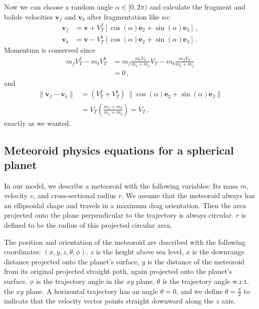 Now we can choose a random angle $\alpha \in [0, 2\pi)$ and calculate the fragment and bolide velocities $\pmb{v}_f$ and $\pmb{v}_b$ after fragmentation like so:
\begin{align}
    \pmb{v}_f &= \pmb{v} + V_T^f[\cos(\alpha)\pmb{e}_2 + \sin(\alpha)\pmb{e}_3]\,,\\
    \pmb{v}_b &= \pmb{v} - V_T^b[\cos(\alpha)\pmb{e}_2 + \sin(\alpha)\pmb{e}_3]\,.
\end{align}
Momentum is conserved since
\begin{align*}
    m_f V_T^f - m_b V_T^b &= m_f\frac{m_b V_T}{m_b + m_f}V_T - m_b\frac{m_f V_T}{m_b + m_f} \\
    &= 0\,,
\end{align*}
and 
\begin{align*}
    \|\pmb{v}_f - \pmb{v}_b\| &= (V_T^f + V_T^b)\ \|\cos(\alpha)\pmb{e}_2 + \sin(\alpha)\pmb{e}_3\| \\
    &= V_T \left(\frac{m_f + m_b}{m_f + m_b}\right) = V_T\,,
\end{align*}
exactly as we wanted.

\subsection{Meteoroid physics equations for a spherical planet}

In our model, we describe a meteoroid with the following variables: Its mass $m$, velocity $v$, and cross-sectional radius $r$. We assume that the meteoroid always has an ellipsoidal shape and travels in a maximum drag orientation. Then the area projected onto the plane perpendicular to the trajectory is always circular. $r$ is defined to be the radius of this projected circular area.

The position and orientation of the meteoroid are described with the following coordinates: $(x, y, z, \theta, \phi)$. $z$ is the height above sea level, $x$ is the downrange distance projected onto the planet's surface, $y$ is the distance of the meteoroid from its original projected straight path, again projected onto the planet's surface. $\phi$ is the trajectory angle in the $xy$ plane, $\theta$ is the trajectory angle w.r.t. the $xy$ plane. A horizontal trajectory has an angle $\theta = 0$, and we define $\theta = \frac{\pi}{2}$ to indicate that the velocity vector points straight downward along the $z$ axis.

